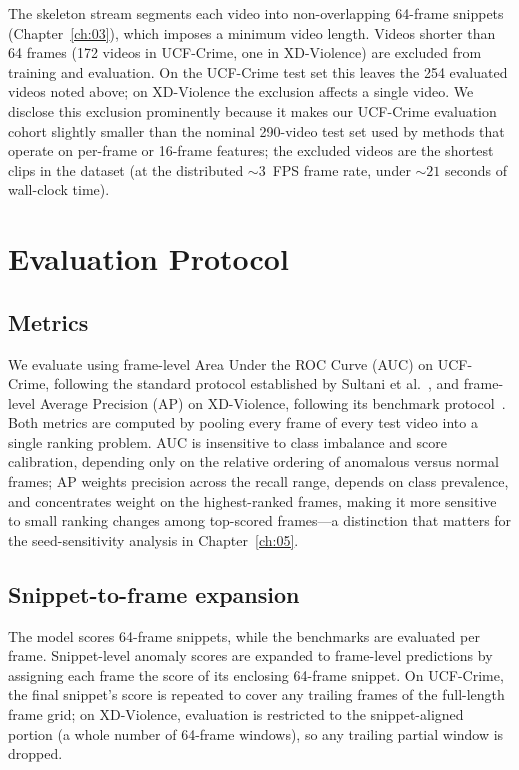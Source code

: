 The skeleton stream segments each video into non-overlapping 64-frame
snippets (Chapter~\ref{ch:03}), which imposes a minimum video length. Videos
shorter than 64 frames (172 videos in UCF-Crime, one in XD-Violence) are
excluded from training and evaluation. On the UCF-Crime test set this leaves
the 254 evaluated videos noted above; on XD-Violence the exclusion affects a
single video. We disclose this exclusion prominently because it makes our
UCF-Crime evaluation cohort slightly smaller than the nominal 290-video test
set used by methods that operate on per-frame or 16-frame features; the
excluded videos are the shortest clips in the dataset (at the distributed
${\sim}3$~FPS frame rate, under ${\sim}21$ seconds of wall-clock time).

\section{Evaluation Protocol}
\label{sec:protocol}

\subsection{Metrics}

We evaluate using frame-level Area Under the ROC Curve (AUC) on UCF-Crime,
following the standard protocol established by Sultani et
al.~\cite{sultani2018ucfcrime}, and frame-level Average Precision (AP) on
XD-Violence, following its benchmark protocol~\cite{wu2020xdviolence}. Both
metrics are computed by pooling every frame of every test video into a single
ranking problem. AUC is insensitive to class imbalance and score calibration,
depending only on the relative ordering of anomalous versus normal frames; AP
weights precision across the recall range, depends on class prevalence, and
concentrates weight on the highest-ranked frames, making it more sensitive to
small ranking changes among top-scored frames---a distinction that matters for
the seed-sensitivity analysis in Chapter~\ref{ch:05}.

\subsection{Snippet-to-frame expansion}

The model scores 64-frame snippets, while the benchmarks are evaluated per
frame. Snippet-level anomaly scores are expanded to frame-level predictions by
assigning each frame the score of its enclosing 64-frame snippet. On
UCF-Crime, the final snippet's score is repeated to cover any trailing frames
of the full-length frame grid; on XD-Violence, evaluation is restricted to the
snippet-aligned portion (a whole number of 64-frame windows), so any trailing
partial window is dropped.

